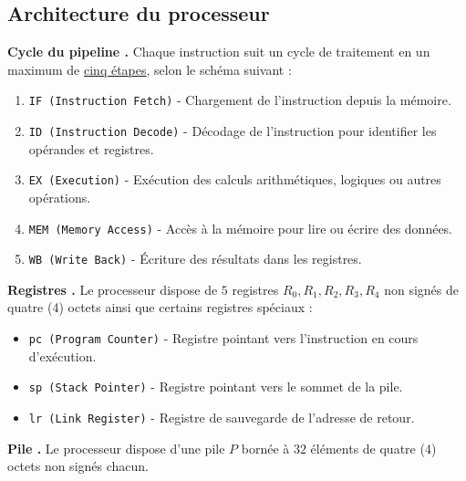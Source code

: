 \subsection*{Architecture du processeur}
\noindent
\textbf{Cycle du pipeline .} \quad
Chaque instruction suit un cycle de traitement en un maximum de 
\underline{cinq étapes}, selon le schéma suivant :
\begin{enumerate}
  \item \texttt{IF (Instruction Fetch)} - Chargement de l'instruction
    depuis la mémoire.
  \item \texttt{ID (Instruction Decode)} - Décodage de l'instruction
    pour identifier les opérandes et registres.
  \item \texttt{EX (Execution)} - Exécution des calculs arithmétiques,
    logiques ou autres opérations.
  \item \texttt{MEM (Memory Access)} - Accès à la mémoire pour lire ou
    écrire des données.
  \item \texttt{WB (Write Back)} - Écriture des résultats dans les
    registres.
\end{enumerate}
\medskip

\noindent
\textbf{Registres .} \quad
Le processeur dispose de $5$ registres $R_0, R_1, R_2, R_3, R_4$ non
signés de quatre (4) octets ainsi que certains registres spéciaux :
\begin{itemize}
  \item \texttt{pc (Program Counter)} - Registre pointant vers 
    l'instruction en cours d'exécution.
  \item \texttt{sp (Stack Pointer)} - Registre pointant vers le sommet
    de la pile.
  \item \texttt{lr (Link Register)} - Registre de sauvegarde de 
    l'adresse de retour.
\end{itemize}
\medskip

\noindent
\textbf{Pile .} \quad
Le processeur dispose d'une pile $P$ bornée à $32$ éléments de quatre
(4) octets non signés chacun. 
